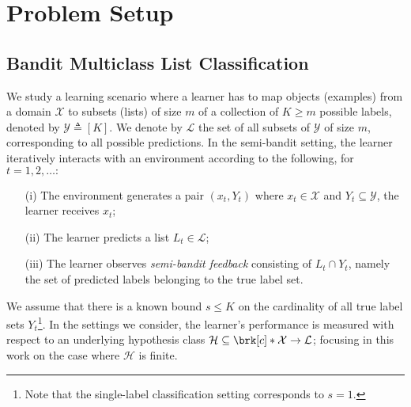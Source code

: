 \documentclass[11pt]{article}
\newcommand{\eqdef}{\triangleq}
\newcommand{\truelab}{Y}
\newcommand{\predlist}{L}
\newcommand{\calX}{\mathcal{X}}
\newcommand{\calY}{\mathcal{Y}}
\newcommand{\calH}{\mathcal{H}}
\newcommand{\calL}{\mathcal{L}}
\theoremstyle{plain}
\begin{document}
\section{Problem Setup}
\label{sec:setup}

\subsection{Bandit Multiclass List Classification}

We study a learning scenario where a learner has to map objects (examples) from a domain $\calX$ to subsets (lists) of size $m$ of a collection of $K \geq m$ possible labels, denoted by $\calY \eqdef [K]$. We denote by $\calL$ the set of all subsets of $\calY$ of size $m$, corresponding to all possible predictions. In the semi-bandit setting, the learner iteratively interacts with an environment according to the following, for $t=1,2,\ldots:$
% 
\begin{enumerate}[leftmargin=!,itemsep=0pt,parsep=0pt]
    \item[(i)] The environment generates a pair $(x_t, \truelab_t)$ where $x_t \in \calX$ and $\truelab_t \subseteq \calY$, the learner receives $x_t$;
    \item[(ii)] The learner predicts a list $\predlist_t \in \calL$;
    \item[(iii)] The learner observes \emph{semi-bandit feedback} consisting of $\predlist_t \cap \truelab_t$, namely the set of predicted labels belonging to the true label set.
\end{enumerate}
% 
We assume that there is a known bound $s \leq K$ on the cardinality of all true label sets $\truelab_t$\footnote{Note that the single-label classification setting corresponds to $s=1$.}. In the settings we consider, the learner's performance is measured with respect to an underlying hypothesis class $\calH \subseteq \brk[c]*{\calX \to \calL}$; focusing in this work on the case where $\calH$ is finite.
\end{document}
